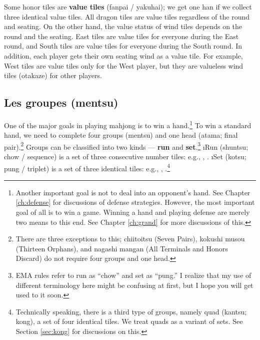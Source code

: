 \noindent Some honor tiles are {\bf value tiles} ({\jap fanpai / yakuhai}); we get one {\jap han} if we collect three identical value tiles. All dragon tiles are value tiles regardless of the round and seating. On the other hand, the value status of wind tiles depends on the round and the seating. East tiles are value tiles for everyone during the East round, and South tiles are value tiles for everyone during the South round. In addition, each player gets their own seating wind as a value tile. For example, West tiles are value tiles only for the West player, but they are valueless wind tiles ({\jap otakaze}) for other players.

\vfill
\subsection{Les groupes ({\jap mentsu})}
 

One of the major goals in playing mahjong is to win a hand.\footnote{Another important goal is not to deal into an opponent's hand. See Chapter \ref{ch:defense} for discussions of defense strategies. However, the most important goal of all is to win a game. Winning a hand and playing defense are merely two means to this end. See Chapter \ref{ch:grand} for more discussions of this.}
To win a standard hand, we need to complete four groups ({\jap mentsu}) and one head ({\jap atama}; final pair).\footnote{There are three exceptions to this; {\jap chiitoitsu} (Seven Pairs), {\jap kokushi musou} (Thirteen Orphans), and {\jap nagashi mangan} (All Terminals and Honors Discard) do not require four groups and one head.} 
Groups can be classified into two kinds --- {\bf run} and {\bf set}.\footnote{EMA rules refer to run as ``chow'' and set as ``pung.'' I realize that my use of different terminology here might be confusing at first, but I hope you will get used to it soon.}
\bi
\i Run ({\jap shuntsu}; chow / sequence) is a set of three consecutive number tiles: e.g., {\LARGE {}}, {\LARGE {}}. 
\i Set ({\jap kotsu}; pung / triplet) is a set of three identical tiles: e.g., {\LARGE {}}, {\LARGE \fa\fa\fa}.\footnote{Technically speaking, there is a third type of groups, namely quad ({\jap kantsu}; kong), a set of four identical tiles. We treat quads as a variant of sets. See Section \ref{sec:kong} for discussions on this.} 
\ei
 

